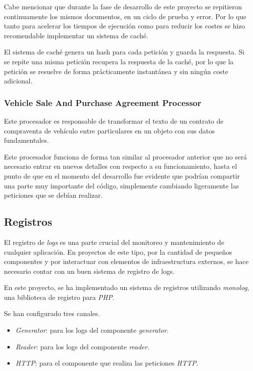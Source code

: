 Cabe mencionar que durante la fase de desarrollo de este proyecto se repitieron continuamente los mismos documentos,
en un ciclo de prueba y error.
Por lo que tanto para acelerar los tiempos de ejecución como para reducir los costes se hizo recomendable implementar un
sistema de caché.

El sistema de caché genera un hash para cada petición y guarda la respuesta.
Si se repite una misma petición recupera la respuesta de la caché, por lo que la petición se resuelve de forma
prácticamente instantánea y sin ningún coste adicional.

\subsubsection*{Vehicle Sale And Purchase Agreement Processor}

Este procesador es responsable de transformar el texto de un contrato de compraventa de vehículo entre particulares en
un objeto con sus datos fundamentales.

Este procesador funciona de forma tan similar al procesador anterior que no será necesario entrar en nuevos detalles
con respecto a su funcionamiento, hasta el punto de que en el momento del desarrollo fue evidente que podrían
compartir una parte muy importante del código, simplemente cambiando ligeramente las peticiones que se debían realizar.

\subsection*{Registros}\label{subsec:logs}

El registro de \textit{logs} es una parte crucial del monitoreo y mantenimiento de cualquier aplicación.
En proyectos de este tipo, por la cantidad de pequeños componentes y por interactuar con elementos de infraestructura
externos, se hace necesario contar con un buen sistema de registro de logs.

En este proyecto, se ha implementado un sistema de registros utilizando \textit{monolog}, una biblioteca de registro
para \textit{PHP}.

Se han configurado tres canales.

\begin{itemize}
    \item \textit{Generator}: para los logs del componente \textit{generator}.
    \item \textit{Reader}: para los logs del componente \textit{reader}.
    \item \textit{HTTP}: para el componente que realiza las peticiones \textit{HTTP}.
\end{itemize}


